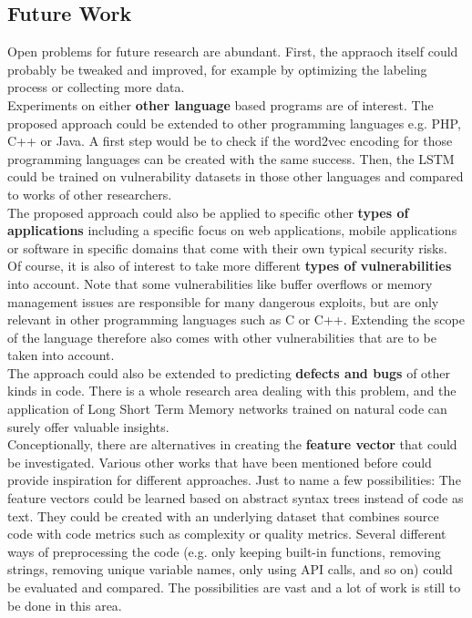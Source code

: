 \documentclass[
	a4paper,
	pagesize,
	pdftex,
	12pt,
	twoside, %
	BCOR=5mm, %
	ngerman,
	fleqn,
	final,
	]{scrartcl}
\begin{document}
\subsection{Future Work}
Open problems for future research are abundant. First, the appraoch itself could probably be tweaked and improved, for example by optimizing the labeling process or collecting more data.\\
Experiments on either \textbf{other language} based programs are of interest. The proposed approach could be extended to other programming languages e.g. PHP, C++ or Java. A first step would be to check if the word2vec encoding for those programming languages can be created with the same success. Then, the LSTM could be trained on vulnerability datasets in those other languages and compared to works of other researchers. \\
The proposed approach could also be applied to specific other \textbf{types of applications} including a specific focus on web applications, mobile applications or software in specific domains that come with their own typical security risks.\\
Of course, it is also of interest to take more different \textbf{types of vulnerabilities} into account. Note that some vulnerabilities like buffer overflows or memory management issues are responsible for many dangerous exploits, but are only relevant in other programming languages such as C or C++. Extending the scope of the language therefore also comes with other vulnerabilities that are to be taken into account.\\
The approach could also be extended to predicting \textbf{defects and bugs} of other kinds in code. There is a whole research area dealing with this problem, and the application of Long Short Term Memory networks trained on natural code can surely offer valuable insights.\\
Conceptionally, there are alternatives in creating the \textbf{feature vector} that could be investigated. Various other works that have been mentioned before could provide inspiration for different approaches. Just to name a few possibilities: The feature vectors could be learned based on abstract syntax trees instead of code as text. They could be created with an underlying dataset that combines source code with code metrics such as complexity or quality metrics. Several different ways of preprocessing the code (e.g. only keeping built-in functions, removing strings, removing unique variable names, only using API calls, and so on) could be evaluated and compared. The possibilities are vast and a lot of work is still to be done in this area.\\
\end{document}
